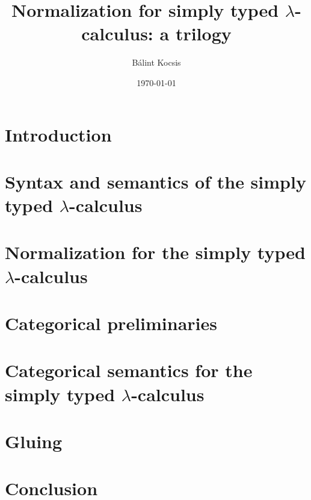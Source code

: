 \documentclass{report}
\title{Normalization for simply typed $\lambda$-calculus: a trilogy}
\author{Bálint Kocsis}
\date{\today}
\begin{document}
\maketitle

\tableofcontents


\chapter{Introduction} \label{chap:intro}


\chapter{Syntax and semantics of the simply typed \texorpdfstring{$\lambda$}{lambda}-calculus} \label{chap:stlc}


\chapter{Normalization for the simply typed \texorpdfstring{$\lambda$}{lambda}-calculus} \label{chap:norm-stlc}


\chapter{Categorical preliminaries} \label{chap:cat-prelims}


\chapter{Categorical semantics for the simply typed \texorpdfstring{$\lambda$}{lambda}-calculus} \label{chap:stlc-cat}


\chapter{Gluing} \label{chap:gluing}


\chapter{Conclusion}




\end{document}
